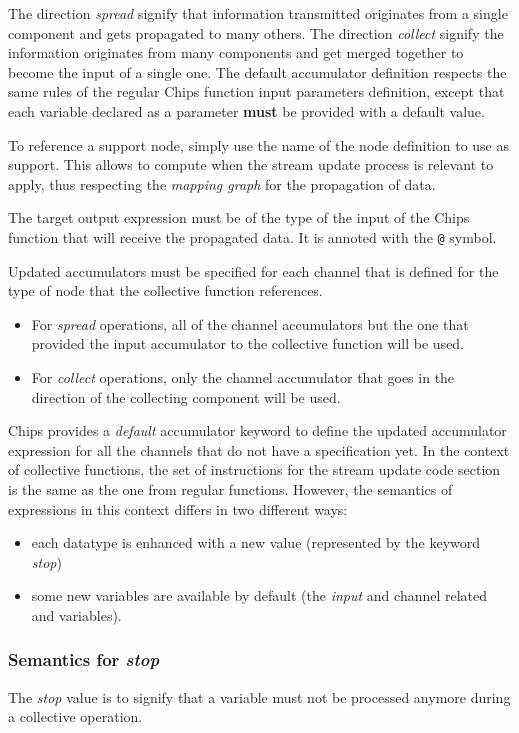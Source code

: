 \documentclass[runningheads]{llncs}
\begin{document}
The direction \emph{spread} signify that information transmitted originates from a single component and gets propagated to many others. The direction \emph{collect} signify the information originates from many components and get merged together to become the input of a single one.
The default accumulator definition respects the same rules of the regular Chips function input parameters definition, except that each variable declared as a parameter \textbf{must} be provided with a default value.

To reference a support node, simply use the name of the node definition to use as support. This allows to compute when the stream update process is relevant to apply, thus respecting the \emph{mapping graph} for the propagation of data.

The target output expression must be of the type of the input of the Chips function that will receive the propagated data. It is annoted with the \texttt{@} symbol.

Updated accumulators must be specified for each channel that is defined for the type of node that the collective function references.
\begin{itemize}
    \item For \emph{spread} operations, all of the channel accumulators but the one that provided the input accumulator to the collective function will be used.
    \item For \emph{collect} operations, only the channel accumulator that goes in the direction of the collecting component will be used.
\end{itemize}

Chips provides a \emph{default} accumulator keyword to define the updated accumulator expression for all the channels that do not have a specification yet.
In the context of collective functions, the set of instructions for the stream update code section is the same as the one from regular functions. However, the semantics of expressions in this context differs in two different ways:
\begin{itemize}
    \item each datatype is enhanced with a new value (represented by the keyword \emph{stop})
    \item some new variables are available by default (the \emph{input} and channel related and variables).
\end{itemize}

\subsubsection{Semantics for \emph{stop}}
The \emph{stop} value is to signify that a variable must not be processed anymore during a collective operation. 
\end{document}
